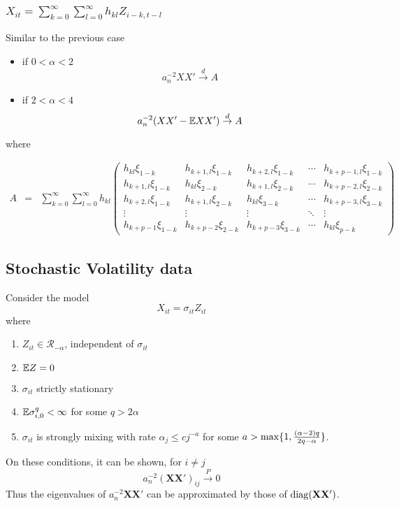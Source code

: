 \documentclass{beamer}
\begin{document}
\begin{frame}
  \frametitle{$X_{it} = \sum_{k=0}^\infty \sum_{l=0}^\infty h_{kl}
    Z_{i-k,t-l}$}
  Similar to the previous case
  \begin{itemize}
  \item if $0 < \alpha < 2$
    \[
    a_n^{-2} XX'  \overset{d}{\to} A 
    \]
  \item if $2 < \alpha < 4$
    \[
    a_n^{-2} (XX' - \mathbb{E} XX' ) \overset{d}{\to} A
    \]
  \end{itemize}
  where
  \begin{footnotesize}
    \begin{eqnarray*}
      A &=& \sum_{k=0}^\infty \sum_{l=0}^\infty h_{kl}
      \begin{pmatrix}
        h_{kl} \xi_{1-k} & 
        h_{k+1,l} \xi_{1-k} & 
        h_{k+2,l} \xi_{1-k} & \cdots & h_{k+p-1,l}
        \xi_{1-k}\\
        h_{k+1,l} \xi_{1-k} &
        h_{kl} \xi_{2-k} & 
        h_{k+1,l} \xi_{2-k} & \cdots & h_{k+p-2,l}
        \xi_{2-k}\\
        h_{k+2,l} \xi_{1-k} &
        h_{k+1,l} \xi_{2-k} & 
        h_{kl} \xi_{3-k} & \cdots &
        h_{k+p-3,l} \xi_{3-k}\\
        \vdots & \vdots & \vdots & \ddots & \vdots \\
        h_{k+p-1} \xi_{1-k} & h_{k+p-2} \xi_{2-k} &
        h_{k+p-3} \xi_{3-k} & \cdots & h_{kl} \xi_{p-k}
      \end{pmatrix}
    \end{eqnarray*}
  \end{footnotesize}
\end{frame}

\subsection{Stochastic Volatility data}
Consider the model
\[
X_{it} = \sigma_{it} Z_{it}
\]
where
\begin{enumerate}
\item $Z_{it} \in \mathcal R_{-\alpha}$, independent of $\sigma_{it}$
\item $\mathbb{E} Z = 0$
\item $\sigma_{it}$ strictly stationary
\item $\mathbb{E} \sigma_{i,0}^q < \infty$ for some $q > 2\alpha$
\item $\sigma_{it}$ is strongly mixing with rate $\alpha_j \leq c
  j^{-a}$ for some $a > \max\{1, {(\alpha - 2) q \over 2 q - \alpha}\}$.
\end{enumerate}
On these conditions, it can be shown, for $i \neq j$
\[
a_n^{-2 }(\mathbf{XX'})_{ij} \overset{P}{\to} 0
\]
Thus the eigenvalues of $a_n^{-2 } \mathbf{XX'}$ can be approximated by those
of $\operatorname{diag}(\mathbf{XX'})$.
\end{document}
